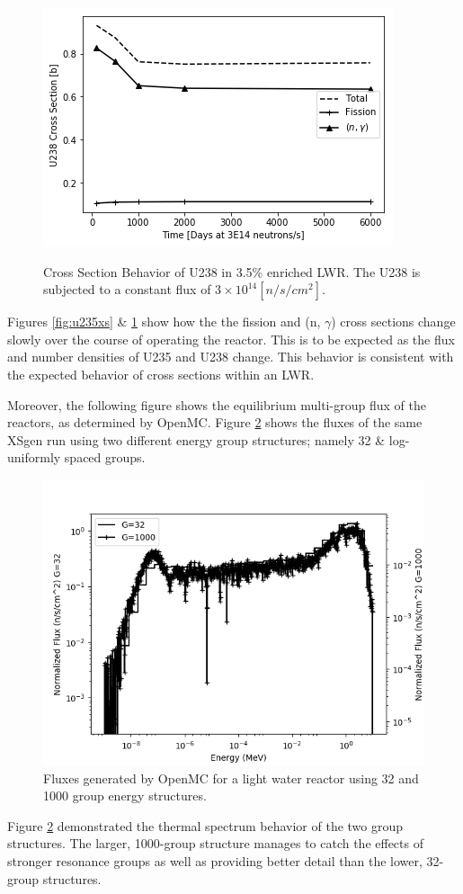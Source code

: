 \documentclass{article}
\begin{document}
\begin{figure}
\caption{Cross Section Behavior of U238 in 3.5\% enriched LWR. The U238 is subjected to a constant flux of $3\times10^{14}[n/s/cm^2]$.}
\includegraphics[scale=0.8]{U238xs.png}
\label{fig:u238xs}
\end{figure}

Figures \ref{fig:u235xs} \& \ref{fig:u238xs} show how the the fission and (n, $\gamma$)
cross sections change slowly over the course of operating the reactor. This is to be
expected as the flux and number densities of U235 and U238 change. 
This behavior is consistent with the expected behavior of cross sections within an LWR.

Moreover, the following figure shows the equilibrium multi-group flux of the reactors, as
determined by OpenMC.
Figure \ref{fig:32g} shows the fluxes of the same XSgen run using two different energy group
structures; namely 32 \& log-uniformly spaced groups.
\begin{figure}[h]
  \center
  \includegraphics[scale=0.7]{fluxes.png}
  \caption{Fluxes generated by OpenMC for a light water reactor using 32 and 1000 group energy structures.}
  \label{fig:32g}
\end{figure}
Figure \ref{fig:32g} demonstrated the thermal spectrum behavior of the two group structures.
The larger, 1000-group structure manages to catch the effects of stronger resonance groups
as well as providing better detail than the lower, 32-group structures.
\end{document}
